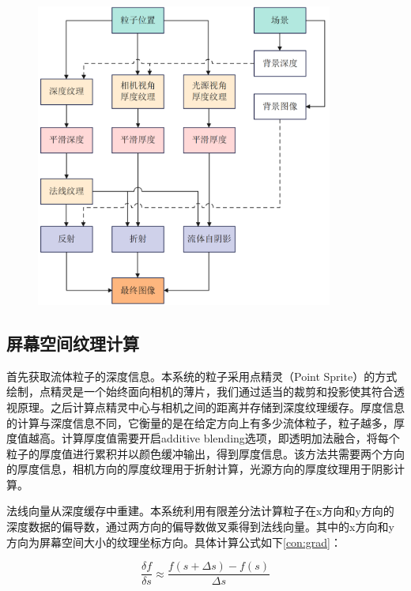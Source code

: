 \begin{figure}[ht]
    \centering
    \includegraphics[height=10cm]{image/renderPipeline.png}
    \label{fig:renderPipeline}
\end{figure}


\subsection{屏幕空间纹理计算}
首先获取流体粒子的深度信息。本系统的粒子采用点精灵（Point Sprite）的方式绘制，点精灵是一个始终面向相机的薄片，我们通过适当的裁剪和投影使其符合透视原理。之后计算点精灵中心与相机之间的距离并存储到深度纹理缓存。厚度信息的计算与深度信息不同，它衡量的是在给定方向上有多少流体粒子，粒子越多，厚度值越高。计算厚度值需要开启additive blending选项，即透明加法融合，将每个粒子的厚度值进行累积并以颜色缓冲输出，得到厚度信息。该方法共需要两个方向的厚度信息，相机方向的厚度纹理用于折射计算，光源方向的厚度纹理用于阴影计算。

法线向量从深度缓存中重建。本系统利用有限差分法计算粒子在x方向和y方向的深度数据的偏导数，通过两方向的偏导数做叉乘得到法线向量。其中的x方向和y方向为屏幕空间大小的纹理坐标方向。具体计算公式如下\ref{con:grad}：

\begin{equation}
    \frac{\delta f}{\delta s} \approx \frac{f(s+\Delta s) - f(s)}{\Delta s}
    \label{con:grad}
\end{equation}

